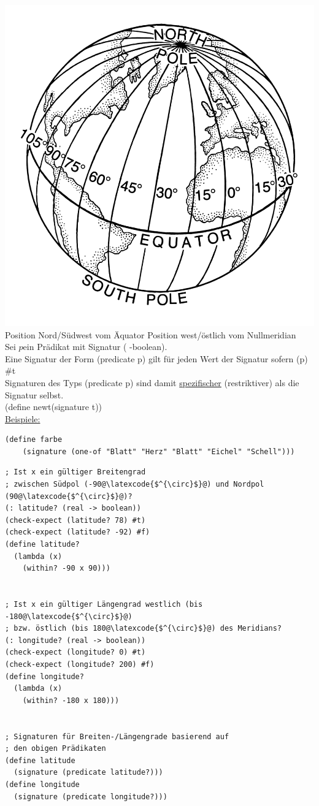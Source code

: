 \includegraphics[scale=0.5]{Longitude}\\
Position Nord/Südwest vom Äquator Position west/östlich vom Nullmeridian\\
Sei \auf$p$\zu ein Prädikat mit Signatur \textcolor{pseudo}{(\argt{} -\zu boolean)}.\\
Eine Signatur der Form \textcolor{pseudo}{(predicate \auf p\zu)} gilt für jeden Wert der Signatur \argt{} sofern (\auf p\zu) \eval \#t\\
Signaturen des Typs \textcolor{pseudo}{(predicate \auf p\zu)} sind damit \underline{spezifischer} (restriktiver) als die Signatur \argt{} selbst.\\
\textcolor{pseudo}{(define \auf newt\zu (signature \auf t\zu))}\\
\underline{Beispiele:}
\begin{lstlisting}
(define farbe
	(signature (one-of "Blatt" "Herz" "Blatt" "Eichel" "Schell")))
\end{lstlisting}
\begin{lstlisting}[frame = single]
; Ist x ein gültiger Breitengrad 
; zwischen Südpol (-90@\latexcode{$^{\circ}$}@) und Nordpol (90@\latexcode{$^{\circ}$}@)?
(: latitude? (real -> boolean))
(check-expect (latitude? 78) #t)
(check-expect (latitude? -92) #f)
(define latitude?
  (lambda (x)
    (within? -90 x 90)))


; Ist x ein gültiger Längengrad westlich (bis -180@\latexcode{$^{\circ}$}@) 
; bzw. östlich (bis 180@\latexcode{$^{\circ}$}@) des Meridians?
(: longitude? (real -> boolean))
(check-expect (longitude? 0) #t)
(check-expect (longitude? 200) #f)
(define longitude?
  (lambda (x)
    (within? -180 x 180)))


; Signaturen für Breiten-/Längengrade basierend auf
; den obigen Prädikaten
(define latitude
  (signature (predicate latitude?)))
(define longitude
  (signature (predicate longitude?)))

\end{lstlisting}